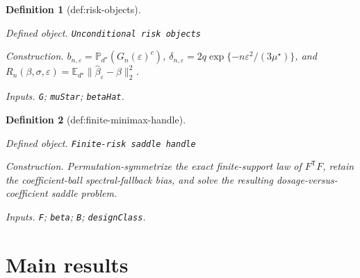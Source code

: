 \documentclass{article}
\newtheorem{definition}{Definition}
\begin{document}
\begin{definition}[def:risk-objects]\label{def:risk-objects}
\par\smallskip\noindent\emph{Defined object.} \texttt{Unconditional risk objects}
\par\smallskip\noindent\emph{Construction.} \(b_{n,\varepsilon}=\mathbb P_{d^\star}(G_n(\varepsilon)^c)\), \(\delta_{n,\varepsilon}=2q\exp\{-n\varepsilon^2/(3\mu^\star)\}\), and \(R_n(\beta,\sigma,\varepsilon)=\mathbb E_{d^\star}\|\widehat\beta_{\varepsilon}-\beta\|_2^2\).
\par\smallskip\noindent\emph{Inputs.} \texttt{G}; \texttt{muStar}; \texttt{betaHat}.
\end{definition}

\begin{definition}[def:finite-minimax-handle]\label{def:finite-minimax-handle}
\par\smallskip\noindent\emph{Defined object.} \texttt{Finite-\allowbreak{}risk saddle handle}
\par\smallskip\noindent\emph{Construction.} Permutation-symmetrize the exact finite-support law of \(F^{\mathsf T}F\), retain the coefficient-ball spectral-fallback bias, and solve the resulting dosage-versus-coefficient saddle problem.
\par\smallskip\noindent\emph{Inputs.} \texttt{F}; \texttt{beta}; \texttt{B}; \texttt{designClass}.
\end{definition}

\section{Main results}
\end{document}
